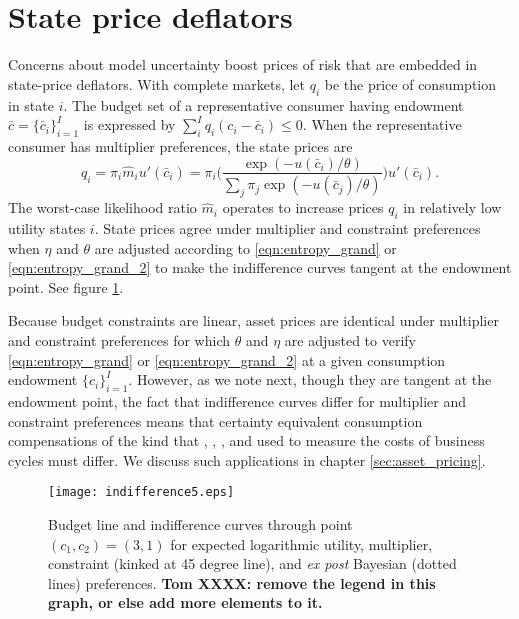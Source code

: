 \section{State price deflators\label{sec:state_price_static}}

Concerns about model uncertainty boost prices of risk that are  embedded in state-price deflators.
With complete markets, let $q_i$ be the price of consumption in state $i$.  The budget
 set of a representative consumer having endowment  $\bar c = \{\bar c_i\}_{i=1}^I$ is expressed by
$ \sum_{i}^I q_i (c_i - \bar c_i) \leq 0$.  When the representative consumer has
multiplier preferences, the state prices are
\begin{equation}\label{eqn:state_price}
q_i = \pi_i \hat m_i u'(\bar c_i) = \pi_i \Biggl(\frac{\exp(-u(\bar c_i)/\theta)}{\sum_j  \pi_j \exp(-u(\bar c_j)/\theta)}\Biggr) u'(\bar c_i) .
\end{equation}
The  worst-case likelihood ratio $\hat m_i$  operates to increase  prices $q_i$  in relatively low utility states $i$.
State prices agree under multiplier and constraint preferences when $\eta$ and $\theta$ are adjusted
according to
\eqref{eqn:entropy_grand} or \eqref{eqn:entropy_grand_2} to make the indifference curves tangent at the endowment point.  See figure \ref{fig_indifference5}.

Because budget constraints are linear, asset prices are identical under multiplier and constraint preferences for which  $\theta$ and $\eta$ are adjusted to verify \eqref{eqn:entropy_grand} or \eqref{eqn:entropy_grand_2} at a given consumption endowment $\{c_i\}_{i=1}^I$.
However, as we note next, though they are tangent at the endowment point, the fact that indifference curves differ for multiplier and constraint preferences means that   certainty equivalent consumption
compensations of the kind that \citet{lucas1987,LucasAEAPres}, \citet{robustpi}, \citet{tallarini2000}, and \citet{bhs2007} used to measure the costs of business cycles must  differ.
We discuss such applications in chapter \ref{sec:asset_pricing}.


\begin{figure}[htp]
\centering
\texttt{[image: indifference5.eps]}
\caption[Budget line and indifference curves ]{Budget line and indifference curves through point $(c_1, c_2) = (3,1)$ %
for expected logarithmic utility,  multiplier,  constraint (kinked at 45 degree line),
and \textit{ex post} Bayesian (dotted lines) preferences. \textbf{Tom XXXX: remove the legend in this graph, or else add more elements to it.}}
\label{fig_indifference5}
\end{figure}


